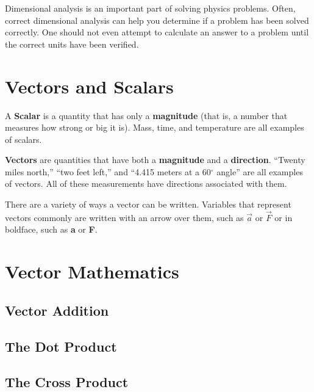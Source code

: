 	Dimensional analysis is an important part of solving physics problems.  Often, correct dimensional analysis can help you determine if a problem has been solved correctly.  One should not even attempt to calculate an answer to a problem until the correct units have been verified. 



		


\section{Vectors and Scalars}
	A \textbf{Scalar}  is a quantity that has only a \textbf{magnitude} (that is, a number that measures how strong or big it is).  Mass, time, and temperature are all examples of scalars.  

	\textbf{Vectors}  are quantities that have both a \textbf{magnitude} and a \textbf{direction}.  ``Twenty miles north,'' ``two feet left,'' and ``4.415 meters at a 60$^\circ$ angle'' are all examples of vectors.  All of these measurements have directions associated with them. 
	
	There are a variety of ways a vector can be written.  Variables that represent vectors commonly are written with an arrow over them, such as $\vec{a}$ or $\vec{F}$ or in boldface, such as \textbf{a} or \textbf{F}.  
	
	
	
\section{Vector Mathematics}
	\subsection{Vector Addition}
	\subsection{The Dot Product}
	\subsection{The Cross Product}
	
